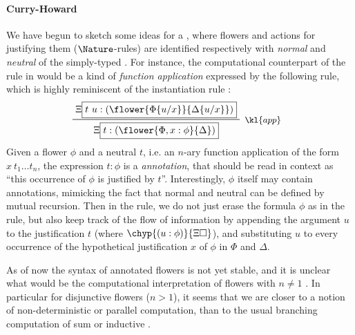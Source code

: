 \begin{scope}
\paragraph{Curry-Howard}

We have begun to sketch some ideas for a , where
flowers and \Proof actions for justifying them ($\Nature$-rules) are identified
respectively with \emph{normal} and \emph{neutral}  of the simply-typed
. For instance, the computational counterpart of the rule
 in  would be a kind of \emph{function application}
expressed by the following  rule, which is highly reminiscent of the
instantiation rule :
$$
\R[\kl{app}]
  {\Xi\select{t~u : (\flower{\subst{\Phi}{u}{x}}{\subst{\Delta}{u}{x}})}}
  {\Xi\select{t : (\flower{\Phi, x : \phi}{\Delta})}}
$$
Given a flower $\phi$ and a neutral  $t$, i.e. an $n$-ary function
application of the form $x~t_1 \ldots t_n$, the expression $t : \phi$ is a
\emph{ annotation}, that should be read in context as ``this occurrence of
$\phi$ is justified by $t$''. Interestingly, $\phi$ itself may contain 
annotations, mimicking the fact that normal and neutral  can be defined by
mutual recursion. Then in the  rule, we do not just erase the formula
$\phi$ as in the  rule, but also keep track of the flow of
information by appending the argument $u$ to the justification $t$ (where
$\chyp{(u : \phi)}{\Xi\hole}$), and substituting $u$ to every occurrence of the
hypothetical justification $x$ of $\phi$ in $\Phi$ and $\Delta$.

As of now the syntax of annotated flowers is not yet stable, and it is unclear
what would be the computational interpretation of flowers with $n \not= 1$
. In particular for disjunctive flowers ($n > 1$), it seems that we are
closer to a notion of non-deterministic or parallel computation, than to the
usual branching computation of sum or inductive .


\end{scope}
